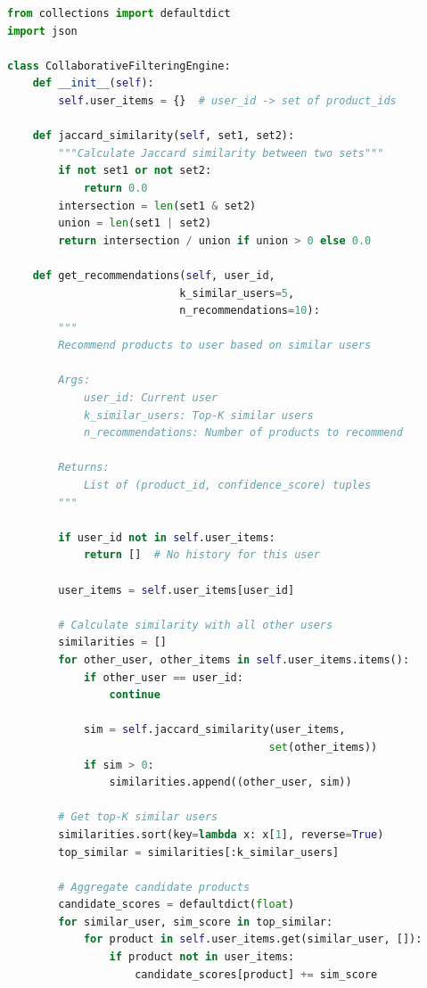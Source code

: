 \documentclass[12pt,a4paper]{article}
\begin{document}
\begin{lstlisting}[language=Python, caption=Collaborative Filtering (recommender-ai-service/app.py)]
from collections import defaultdict
import json

class CollaborativeFilteringEngine:
    def __init__(self):
        self.user_items = {}  # user_id -> set of product_ids
    
    def jaccard_similarity(self, set1, set2):
        """Calculate Jaccard similarity between two sets"""
        if not set1 or not set2:
            return 0.0
        intersection = len(set1 & set2)
        union = len(set1 | set2)
        return intersection / union if union > 0 else 0.0
    
    def get_recommendations(self, user_id, 
                           k_similar_users=5, 
                           n_recommendations=10):
        """
        Recommend products to user based on similar users
        
        Args:
            user_id: Current user
            k_similar_users: Top-K similar users
            n_recommendations: Number of products to recommend
            
        Returns:
            List of (product_id, confidence_score) tuples
        """
        
        if user_id not in self.user_items:
            return []  # No history for this user
        
        user_items = self.user_items[user_id]
        
        # Calculate similarity with all other users
        similarities = []
        for other_user, other_items in self.user_items.items():
            if other_user == user_id:
                continue
            
            sim = self.jaccard_similarity(user_items, 
                                         set(other_items))
            if sim > 0:
                similarities.append((other_user, sim))
        
        # Get top-K similar users
        similarities.sort(key=lambda x: x[1], reverse=True)
        top_similar = similarities[:k_similar_users]
        
        # Aggregate candidate products
        candidate_scores = defaultdict(float)
        for similar_user, sim_score in top_similar:
            for product in self.user_items.get(similar_user, []):
                if product not in user_items:
                    candidate_scores[product] += sim_score
        

\end{lstlisting}
\end{document}
